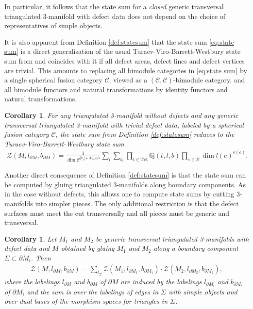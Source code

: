 \documentclass[1.5pt, a4paper]{article}
\newcommand{\mac}{\mathcal C}
\newtheorem{corollary}[theorem]{Corollary}
\begin{document}
In particular, it follows that the state sum for a \emph{closed} generic transversal  triangulated 3-manifold with defect data does not depend on the choice of representatives of simple objects. 

It is also apparent from  Definition \ref{def:statesum} that the state sum \eqref{eq:state sum} is a direct generalisation of the usual Turaev-Viro-Barrett-Westbury state sum from \cite{BW,TV} and coincides with it if all defect areas, defect lines and defect vertices are trivial. This amounts to replacing all bimodule categories in \eqref{eq:state sum} by a single spherical fusion category $\mac$, viewed as a $(\mac,\mac)$-bimodule category, and all bimodule functors and natural transformations by identity functors and natural transformations. 

\begin{corollary}\label{cor:reducedstatesum}
For any triangulated 3-manifold without defects and any generic transversal triangulated 3-manifold with trivial defect data, labeled by a spherical fusion category $\mac$, the state sum from Definition \ref{def:statesum} reduces to the Turaev-Viro-Barrett-Westbury state sum
\begin{align}\label{eq:statesumsph}
\mathcal Z(M, l_{\partial M}, b_{\partial M})=\frac 1 {\dim\mac^{|V_{i}|+|V_{\partial M}|/2}}  \sum_{l}\sum_{b_i}   \prod_{t\in \mathrm{Tet}} \mathrm{6j}(t,l,b)\prod_{e\in E} \dim l(e)^{\epsilon(e)}.
\end{align} 
\end{corollary}

Another direct consequence of  Definition \ref{def:statesum} is that the state sum can be computed by gluing  triangulated 3-manifolds  along  boundary components. As in the case  without defects, this allows one to compute state sums by cutting  3-manifolds into simpler pieces. The only additional restriction  is that the defect surfaces must meet the cut transversally and all pieces must be generic and transversal.

\begin{corollary}\label{cor:gluing} Let $M_1$ and $M_2$ be generic  transversal  triangulated 3-manifolds with defect data and $M$ obtained by gluing $M_1$ and $M_2$ along a boundary component $\Sigma\subset \partial M_i$. Then
\begin{align}
\mathcal Z(M,l_{\partial M}, b_{\partial M})=\sum_{l_\Sigma} \mathcal Z(M_1,l_{\partial M_1}, b_{\partial M_1})\cdot \mathcal Z(M_2,l_{\partial M_2}, b_{\partial M_2}),
\end{align}
where the labelings $l_{\partial M}$ and $b_{\partial M}$ of $\partial M$ are induced by the labelings $l_{\partial M_i}$ and $b_{\partial M_i}$ of $\partial M_i$ and the
 sum is over the labelings of  edges in $\Sigma$ with simple objects and over dual bases of the  morphism spaces for  triangles in $\Sigma$.
\end{corollary}
\end{document}
